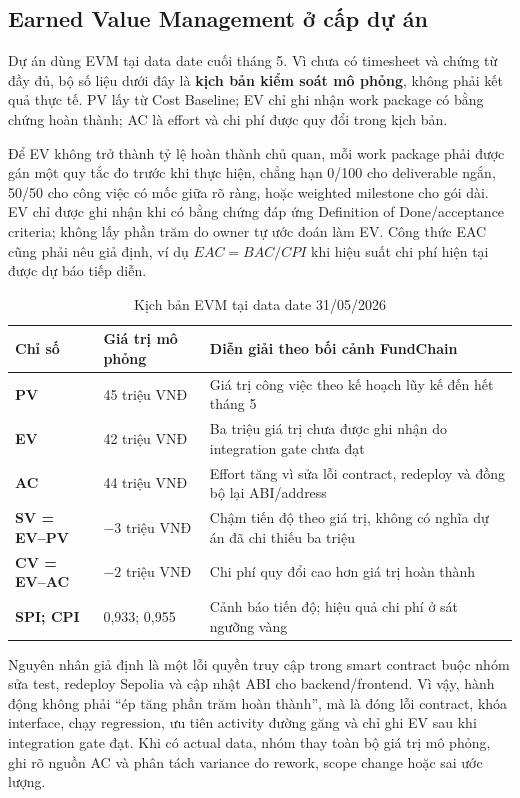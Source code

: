 \subsection{Earned Value Management ở cấp dự án}

Dự án dùng EVM tại data date cuối tháng 5. Vì chưa có timesheet và chứng từ đầy đủ, bộ số liệu dưới đây là \textbf{kịch bản kiểm soát mô phỏng}, không phải kết quả thực tế. PV lấy từ Cost Baseline; EV chỉ ghi nhận work package có bằng chứng hoàn thành; AC là effort và chi phí được quy đổi trong kịch bản.

Để EV không trở thành tỷ lệ hoàn thành chủ quan, mỗi work package phải được gán một quy tắc đo trước khi thực hiện, chẳng hạn 0/100 cho deliverable ngắn, 50/50 cho công việc có mốc giữa rõ ràng, hoặc weighted milestone cho gói dài. EV chỉ được ghi nhận khi có bằng chứng đáp ứng Definition of Done/acceptance criteria; không lấy phần trăm do owner tự ước đoán làm EV. Công thức EAC cũng phải nêu giả định, ví dụ $EAC = BAC/CPI$ khi hiệu suất chi phí hiện tại được dự báo tiếp diễn.

\begin{table}[H]
\centering
\caption{Kịch bản EVM tại data date 31/05/2026}
\label{tab:evm-context-scenario}
\begin{tabularx}{\textwidth}{| >{\bfseries}p{2.2cm} | p{2.4cm} | X |}
\hline
Chỉ số & Giá trị mô phỏng & Diễn giải theo bối cảnh FundChain \\
\hline
PV & 45 triệu VNĐ & Giá trị công việc theo kế hoạch lũy kế đến hết tháng 5 \\ \hline
EV & 42 triệu VNĐ & Ba triệu giá trị chưa được ghi nhận do integration gate chưa đạt \\ \hline
AC & 44 triệu VNĐ & Effort tăng vì sửa lỗi contract, redeploy và đồng bộ lại ABI/address \\ \hline
SV = EV--PV & $-3$ triệu VNĐ & Chậm tiến độ theo giá trị, không có nghĩa dự án đã chi thiếu ba triệu \\ \hline
CV = EV--AC & $-2$ triệu VNĐ & Chi phí quy đổi cao hơn giá trị hoàn thành \\ \hline
SPI; CPI & 0,933; 0,955 & Cảnh báo tiến độ; hiệu quả chi phí ở sát ngưỡng vàng \\
\hline
\end{tabularx}
\end{table}

Nguyên nhân giả định là một lỗi quyền truy cập trong smart contract buộc nhóm sửa test, redeploy Sepolia và cập nhật ABI cho backend/frontend. Vì vậy, hành động không phải ``ép tăng phần trăm hoàn thành'', mà là đóng lỗi contract, khóa interface, chạy regression, ưu tiên activity đường găng và chỉ ghi EV sau khi integration gate đạt. Khi có actual data, nhóm thay toàn bộ giá trị mô phỏng, ghi rõ nguồn AC và phân tách variance do rework, scope change hoặc sai ước lượng.

